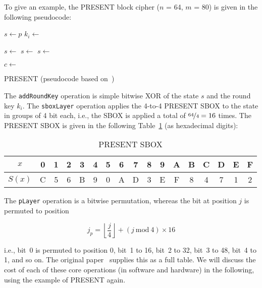 To give an example, the PRESENT block cipher ($n$ = 64, $m$ = 80) is given in the following pseudocode:

\begin{algorithm}
\center
\begin{algorithmic}
\vspace{2mm}
\State $s \gets p$ 
\State $k_i \gets$ 


	\State $s \gets$ 
	\State $s \gets$ 
	\State $s \gets$ 
\EndFor

\State $c \gets$ 

\vspace{2mm}
\end{algorithmic}
\caption{PRESENT (pseudocode based on~\cite{PresentCipher})}
\label{alg:symmetric_crypto:present}
\end{algorithm}

The \verb+addRoundKey+ operation is simple bitwise \ac{XOR} of the state $s$ and the round key $k_i$. The \verb+sboxLayer+ operation applies the 4-to-4 PRESENT \ac{SBOX} to the state in groups of 4 bit each, i.e., the \acs{SBOX} is applied a total of $\nicefrac{64}{4} = 16$ times. The PRESENT \ac{SBOX} is given in the following Table~\ref{tab:symmetric_crypto:present} (as hexadecimal digits):

\begin{table}[htbp]
	\centering
		\begin{tabular}{c | c c c c c c c c c c c c c c c c}
			$x$    & 0 & 1 & 2 & 3 & 4 & 5 & 6 & 7 & 8 & 9 & A & B & C & D & E & F \\\hline
      $S(x)$ & C & 5 & 6 & B & 9 & 0 & A & D & 3 & E & F & 8 & 4 & 7 & 1 & 2
		\end{tabular}
	\caption{PRESENT \ac{SBOX}}
	\label{tab:symmetric_crypto:present}
\end{table}

The \verb+pLayer+ operation is a bitwise permutation, whereas the bit at position $j$ is permuted to position

$$
j_p = \left\lfloor \frac{j}{4} \right\rfloor + \left( j\ \textrm{mod}\ 4 \right) \times 16
$$

i.e., bit~0 is permuted to position 0, bit~1 to 16, bit~2 to 32, bit~3 to 48, bit~4 to 1, and so on. The original paper~\cite{PresentCipher} supplies this as a full table. We will discuss the cost of each of these core operations (in software and hardware) in the following, using the example of PRESENT again.

